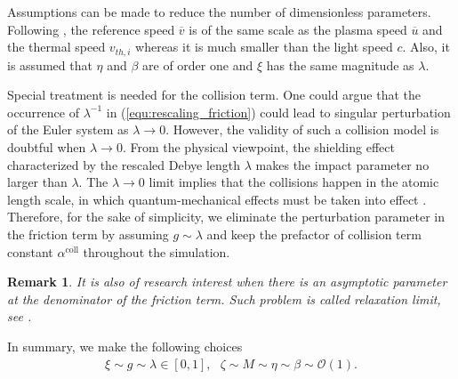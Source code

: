 \documentclass{article}
\newtheorem*{remark}{Remark}
\begin{document}
 Assumptions can be made to reduce the number of dimensionless parameters. Following \cite{degond_2017}, the reference speed $\overline{v}$ is of the same scale as the plasma speed $\overline{u}$ and the thermal speed $v_{th,i}$ whereas it is much smaller than the light speed $c$. Also, it is assumed that $\eta$ and $\beta$ are of order one and $\xi$ has the same magnitude as $\lambda$. 

Special treatment is needed for the collision term. One could argue that the occurrence of $\lambda^{-1}$ in (\ref{equ:rescaling_friction}) could lead to singular perturbation of the Euler system as $\lambda \rightarrow 0$. However, the validity of such a collision model is doubtful when $\lambda \rightarrow 0$. From the physical viewpoint, the shielding effect characterized by the rescaled Debye length $\lambda$ makes the impact parameter no larger than $\lambda$. The $\lambda \rightarrow 0$ limit implies that the collisions happen in the atomic length scale, in which quantum-mechanical effects must be taken into effect \citep{frank_1972}. Therefore, for the sake of simplicity, we eliminate the perturbation parameter in the friction term by assuming $g \sim \lambda$ and keep the prefactor of collision term constant $\alpha^{\text{coll}}$ throughout the simulation.

\begin{remark}
    It is also of research interest when there is an asymptotic parameter at the denominator of the friction term. Such problem is called relaxation limit, see \cite{peng_2011, wasiolek_2016, Li_2021, Chen_2000}.
\end{remark}

In summary, we make the following choices
\begin{align*}
    \xi \sim g \sim \lambda \in [0,1], \ \ \ \zeta \sim M \sim \eta \sim \beta \sim \mathcal{O}(1).
\end{align*}
\end{document}
